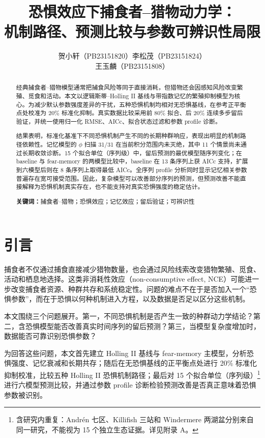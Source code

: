 \documentclass[12pt,a4paper]{ctexart}
\title{\textbf{恐惧效应下捕食者--猎物动力学：\\机制路径、预测比较与参数可辨识性局限}}
\author{%
  贺小轩（PB23151820）\quad 李松茂（PB23151824）\\[0.25em]
  王玉麟（PB23151808）%
}
\date{}
\begin{document}
\maketitle

\begin{abstract}
经典捕食者--猎物模型通常把捕食风险等同于直接消耗，但猎物还会因感知风险改变繁殖、觅食和活动。本文以逻辑斯蒂--Holling II 基线与带指数记忆的繁殖抑制模型为核心。为减少默认参数强度差异的干扰，五种恐惧机制均相对无恐惧基线，在参考正平衡点处校准为 20\% 标准化抑制。真实数据比较采用前 80\% 拟合、后 20\% 连续多步留后验证，并统一使用归一化 RMSE、AICc、拟合状态过滤和参数 profile 诊断。

结果表明，标准化基准下不同恐惧机制产生不同的长期种群响应，表现出明显的机制路径依赖性。记忆模型的 $\phi$ 扫描 31/31 在当前积分范围内未灭绝，其中 11 个情景尚未通过长期收敛诊断。15 个拟合单位（序列级）中，留后预测的最优模型随序列变化；在 baseline 与 fear-memory 的两模型比较中，baseline 在 13 条序列上获 AICc 支持，扩展到六模型后则在 8 条序列上取得最低 AICc。全序列 profile 分析同时显示记忆相关参数普遍存在宽可接受范围。因此，复杂模型可以改善部分序列的预测，但预测改善不能直接解释为恐惧机制真实存在，也不能支持对真实恐惧强度的稳定估计。

\textbf{关键词：}捕食者--猎物；恐惧效应；记忆效应；留后验证；可辨识性
\end{abstract}

\tableofcontents
\newpage

\section{引言}

捕食者不仅通过捕食直接减少猎物数量，也会通过风险线索改变猎物繁殖、觅食、活动和栖息地选择。这类非消耗性效应（non-consumptive effect, NCE）可能进一步改变捕食者资源、种群共存和系统稳定性。问题的难点不在于是否加入一个“恐惧参数”，而在于恐惧以何种机制进入方程，以及数据是否足以区分这些机制。

本文围绕三个问题展开。第一，不同恐惧机制是否产生一致的种群动力学结论？第二，含恐惧模型能否改善真实时间序列的留后预测？第三，当模型复杂度增加时，数据能否可靠识别恐惧参数？

为回答这些问题，本文首先建立 Holling II 基线与 fear-memory 主模型，分析恐惧强度、记忆衰减和长期共存；随后在无恐惧基线的正平衡点处进行 20\% 标准化抑制校准，比较五种 Holling II 恐惧机制路径；最后对 15 个拟合单位（序列级）\footnote{含研究内重复：Andrén 七区、Killifish 三站和 Windermere 两湖盆分别来自同一研究，不能视为 15 个独立生态证据。详见附录 A。}进行六模型预测比较，并通过参数 profile 诊断检验预测改善是否真正意味着恐惧参数被识别。
\end{document}
